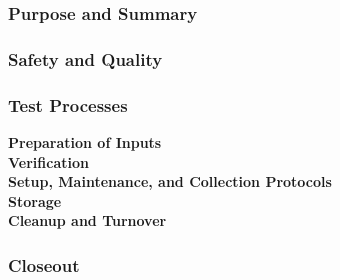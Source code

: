


\subsubsection{Purpose and Summary}

\subsubsection{Safety and Quality}

\subsubsection{Test Processes}

\textbf{Preparation of Inputs}\\


\textbf{Verification}\\


\textbf{Setup, Maintenance, and Collection Protocols}\\


\textbf{Storage}\\


\textbf{Cleanup and Turnover}\\


\subsubsection{Closeout}

